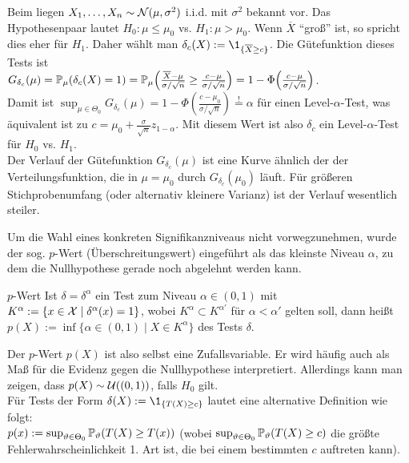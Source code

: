 \linie

\begin{Bsp}
    Beim  liegen
    $X_1, \dotsc, X_n \sim \mathcal{N}(\mu, \sigma^2)$ i.i.d. mit $\sigma^2$ bekannt vor.
    Das Hypothesenpaar lautet $H_0\colon \mu \le \mu_0$ vs. $H_1\colon \mu > \mu_0$.
    Wenn $\overline{X}$ "`groß"' ist, so spricht dies eher für $H_1$.
    Daher wählt man $\delta_c(X) := \1_{\{\overline{X} \ge c\}}$.
    Die Gütefunktion dieses Tests ist\\
    $G_{\delta_c}(\mu) = \mathbb{P}_\mu(\delta_c(X) = 1)
    = \mathbb{P}_\mu\!\left(\frac{\overline{X} - \mu}{\sigma/\sqrt{n}} \ge
    \frac{c - \mu}{\sigma/\sqrt{n}}\right)
    = 1 - \Phi\!\left(\frac{c - \mu}{\sigma/\sqrt{n}}\right)$.\\
    Damit ist $\sup_{\mu \in \Theta_0} G_{\delta_c}(\mu) =
    1 - \Phi\!\left(\frac{c - \mu_0}{\sigma/\sqrt{n}}\right) \overset{!}{=} \alpha$
    für einen Level-$\alpha$-Test,
    was äquivalent ist zu $c = \mu_0 + \frac{\sigma}{\sqrt{n}} z_{1-\alpha}$.
    Mit diesem Wert ist also $\delta_c$ ein Level-$\alpha$-Test für $H_0$ vs. $H_1$.\\
    Der Verlauf der Gütefunktion $G_{\delta_c}(\mu)$ ist eine Kurve ähnlich der der
    Verteilungsfunktion, die in $\mu = \mu_0$ durch $G_{\delta_c}(\mu_0)$ läuft.
    Für größeren Stichprobenumfang (oder alternativ kleinere Varianz) ist der Verlauf wesentlich
    steiler.
\end{Bsp}

\linie
\pagebreak

\begin{Bem}
    Um die Wahl eines konkreten Signifikanzniveaus nicht vorwegzunehmen, wurde der sog.
    $p$-Wert (Überschreitungswert) eingeführt als das kleinste Niveau $\alpha$,
    zu dem die Nullhypothese gerade noch abgelehnt werden kann.
\end{Bem}

\begin{Def}{$p$-Wert}
    Ist $\delta = \delta^\alpha$ ein Test zum Niveau $\alpha \in (0, 1)$ mit
    \\
    $K^\alpha := \{x \in \mathcal{X} \;|\; \delta^\alpha(x) = 1\}$,
    wobei $K^\alpha \subset K^{\alpha'}$ für $\alpha < \alpha'$ gelten soll, dann heißt\\
    $p(X) := \inf\{\alpha \in (0,1) \;|\; X \in K^\alpha\}$  des Tests $\delta$.
\end{Def}

\begin{Bem}
    Der $p$-Wert $p(X)$ ist also selbst eine Zufallsvariable.
    Er wird häufig auch als Maß für die Evidenz gegen die Nullhypothese interpretiert.
    Allerdings kann man zeigen, dass $p(X) \sim \mathcal{U}((0, 1))$, falls $H_0$ gilt.\\
    Für Tests der Form $\delta(X) := \1_{\{T(X) \ge c\}}$ lautet eine alternative Definition
    wie folgt:\\
    $p(x) := \sup_{\vartheta \in \Theta_0} \mathbb{P}_\vartheta(T(X) \ge T(x))$
    (wobei $\sup_{\vartheta \in \Theta_0} \mathbb{P}_\vartheta(T(X) \ge c)$ die größte
    Fehlerwahrscheinlichkeit 1. Art ist, die bei einem bestimmten $c$ auftreten kann).
\end{Bem}

